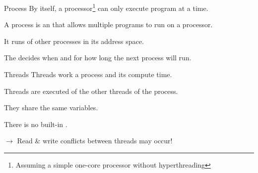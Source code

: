 \documentclass[12pt, aspectratio=169, usepdftitle=false, handout]{beamer}
\begin{document}
\begin{frame}[fragile]{Process}
	    By itself, a processor\footnote{Assuming a simple one-core processor without hyperthreading} can only execute  program at a time.
		\pause
		
		\medskip
		
		A process is an  that allows multiple programs to run  on a processor.
		\pause
		
		\medskip
		
		It runs  of other processes in its  address space.
		\pause
		
		\medskip
		
		The  decides when and for how long the next process will run.

\end{frame}

\begin{frame}[fragile]{Threads}
        Threads work  a process and  its compute time.
		\pause
		
		\medskip
		
		Threads are executed  of the other threads of the process.
		\pause
		
		\medskip
		
		They share the same  variables.
		\pause
		
		\medskip
		
		There is no built-in .
		
		\medskip
		
		$\rightarrow$ Read \& write conflicts between threads may occur!


\end{frame}
\end{document}
